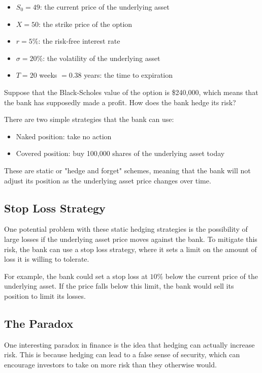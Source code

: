 \documentclass{article}
\theoremstyle{mytheoremstyle}
\theoremstyle{mytheoremstyle}
\theoremstyle{myproblemstyle}
\begin{document}
\begin{itemize}
\item $S_0 = 49$: the current price of the underlying asset
\item $X = 50$: the strike price of the option
\item $r = 5\%$: the risk-free interest rate
\item $\sigma = 20\%$: the volatility of the underlying asset
\item $T = 20$ weeks $= 0.38$ years: the time to expiration
\end{itemize}
Suppose that the Black-Scholes value of the option is \$240,000, which means that the bank has supposedly made a profit. How does the bank hedge its risk?

There are two simple strategies that the bank can use:

\begin{itemize}
\item Naked position: take no action
\item Covered position: buy 100,000 shares of the underlying asset today
\end{itemize}

These are static or "hedge and forget" schemes, meaning that the bank will not adjust its position as the underlying asset price changes over time.

\subsection{Stop Loss Strategy}

One potential problem with these static hedging strategies is the possibility of large losses if the underlying asset price moves against the bank. To mitigate this risk, the bank can use a stop loss strategy, where it sets a limit on the amount of loss it is willing to tolerate.

For example, the bank could set a stop loss at $10\%$ below the current price of the underlying asset. If the price falls below this limit, the bank would sell its position to limit its losses.

\subsection{The Paradox}

One interesting paradox in finance is the idea that hedging can actually increase risk. This is because hedging can lead to a false sense of security, which can encourage investors to take on more risk than they otherwise would.
\end{document}

